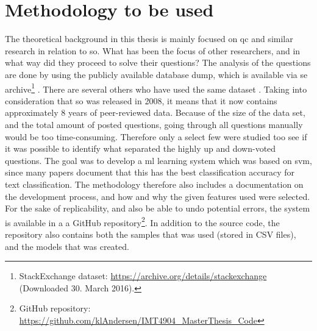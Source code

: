 \section{Methodology to be used}
\label{sec:methodology_to_use}
The theoretical background in this thesis is mainly focused on \gls{qc} and similar research in relation to \gls{so}.
What has been the focus of other researchers, and in what way did they proceed to solve their questions?
The analysis of the questions are done by using the publicly available database dump, which is available via \gls{se} 
archive\footnote{StackExchange dataset: \url{https://archive.org/details/stackexchange} \\ (Downloaded 30. March 2016).} \cite{StackExchange2016}. 
There are several others who have used the same dataset \cite{Ahmed2015, Anderson2012, Hanrahan2012, Movshovitz-Attias2013, Posnett2012, Short2014, Stanley2013, Yang2014}.
Taking into consideration that \gls{so} was released in 2008, it means that it now contains approximately 8 years of peer-reviewed data.
Because of the size of the data set, and the total amount of posted questions, going through all questions manually would be too time-consuming.
Therefore only a select few were studied too see if it was possible to identify what separated the highly up and down-voted questions.
\vspace{0.5em}\newline
The goal was to develop a \gls{ml} learning system which was based on \gls{svm}, since many papers document that this has the best classification accuracy for text classification. 
The methodology therefore also includes a documentation on the development process, and how and why the given features used were selected.
\vspace{0.5em}\newline
For the sake of replicability, and also be able to undo potential errors, the system is available in a a GitHub repository\footnote{
	GitHub repository: 
	\url{https://github.com/klAndersen/IMT4904\_MasterThesis\_Code}
}. 
In addition to the source code, the repository also contains both the samples that was used (stored in CSV files), and the models that was created. 



